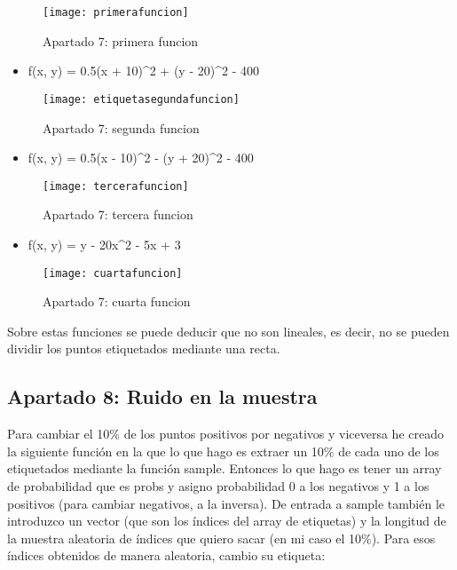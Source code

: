 	\begin{figure} [H]
	\centering
	\texttt{[image: primerafuncion]}
	\caption{Apartado 7: primera funcion}
	\label{fig:primerafuncion}
	\end{figure}
	
	\begin{itemize}
		\item f(x, y) = 0.5(x + 10)^2 + (y - 20)^2 - 400
	\end{itemize}
	
	\begin{figure} [H]
	\centering
	\texttt{[image: etiquetasegundafuncion]}
	\caption{Apartado 7: segunda funcion}
	\label{fig:etiquetasegundafuncion}
	\end{figure}

	\begin{itemize}
		\item f(x, y) = 0.5(x - 10)^2 - (y + 20)^2 - 400
	\end{itemize}
	
	\begin{figure} [H]
	\centering
	\texttt{[image: tercerafuncion]}
	\caption{Apartado 7: tercera funcion}
	\label{fig:tercerafuncion}
	\end{figure}

	\newpage
	
	\begin{itemize}
		\item f(x, y) = y - 20x^2 - 5x + 3
	\end{itemize}
	
	\begin{figure} [H]
		\centering
		\texttt{[image: cuartafuncion]}
		\caption{Apartado 7: cuarta funcion}
		\label{fig:cuarta funcion}
	\end{figure}
	
	Sobre estas funciones se puede deducir que no son lineales, es decir, no se pueden dividir los puntos etiquetados mediante una recta.
	
	\subsection{Apartado 8: Ruido en la muestra}
	Para cambiar el 10\% de los puntos positivos por negativos y viceversa he creado la siguiente función en la que lo que hago es extraer un 10\% de cada uno de los etiquetados mediante la función sample. Entonces lo que hago es tener un array de probabilidad que es probs y asigno probabilidad 0 a los negativos y 1 a los positivos (para cambiar negativos, a la inversa). De entrada a sample también le introduzco un vector (que son los índices del array de etiquetas) y la longitud de la muestra aleatoria de índices que quiero sacar (en mi caso el 10\%). Para esos índices obtenidos de manera aleatoria, cambio su etiqueta:
	
